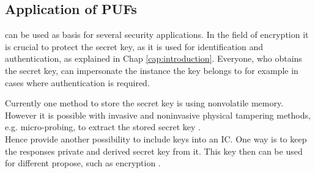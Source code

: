 
\subsection{Application of PUFs}
\label{sec:applicationsofpufs}

\pufs can be used as basis for several security applications.
In the field of encryption it is crucial to protect the secret key, as it is used for identification and authentication, as explained in Chap \ref{cap:introduction}.
Everyone, who obtains the secret key, can impersonate the instance the key belongs to for example in cases where  authentication is required.

Currently one method to store the secret key is using nonvolatile memory.
However it is possible with invasive and noninvasive physical tampering methods, e.g. micro-probing, to extract the stored secret key \cite{Lim2005ExtractingCircuits}.\\
Hence \pufs provide another possibility to include keys into an \ac{IC}.
One way is to keep the \puf responses private and derived secret key from it.
This key then can be used for different propose, such as encryption \cite{Tajik2014PhysicalPUFs}.

